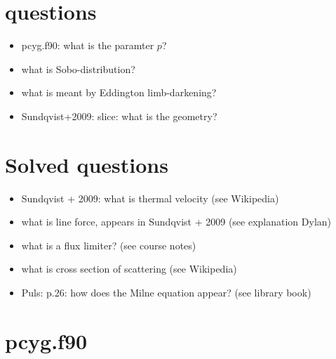 \documentclass[../main/main.tex]{subfiles}
\begin{document}
\section{questions}
\begin{itemize}
\item pcyg.f90: what is the paramter $p$?
\item what is Sobo-distribution?
\item what is meant by Eddington limb-darkening?
\item Sundqvist+2009: slice: what is the geometry?
\end{itemize}

\section{Solved questions}
\begin{itemize}
\item Sundqvist + 2009: what is thermal velocity (see Wikipedia)
\item what is line force, appears in Sundqvist + 2009 (see explanation Dylan)
\item what is a flux limiter? (see course notes)
\item what is cross section of scattering (see Wikipedia)
\item Puls: p.26: how does the Milne equation appear? (see library book)
\end{itemize}

\newpage
\section{pcyg.f90}
\end{document}
